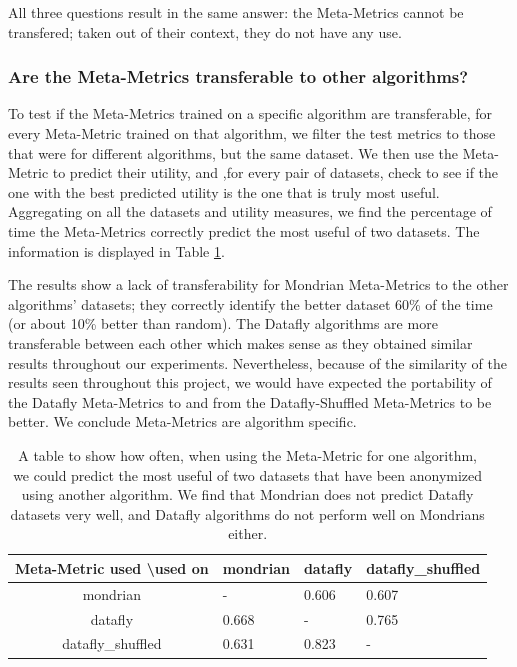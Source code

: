 All three questions result in the same answer: the Meta-Metrics cannot be transfered; taken out of their context, they do not have any use. 


\subsubsection{Are the Meta-Metrics transferable to other algorithms?}
To test if the Meta-Metrics trained on a specific algorithm are transferable, for every Meta-Metric trained on that algorithm, we filter the test metrics to those that were for different algorithms, but the same dataset. We then use the Meta-Metric to predict their utility, and ,for every pair of datasets, check to see if the one with the best predicted utility is the one that is truly most useful. Aggregating on all the datasets and utility measures, we find the percentage of time the Meta-Metrics correctly predict the most useful of two datasets. The information is displayed in Table \ref{tab:1v1_cross_algo}. 

The results show a lack of transferability for Mondrian Meta-Metrics to the other algorithms' datasets; they correctly identify the better dataset 60\% of the time (or about 10\% better than random). The Datafly algorithms are more transferable between each other which makes sense as they obtained similar results throughout our experiments. Nevertheless, because of the similarity of the results seen throughout this project, we would have expected the portability of the Datafly Meta-Metrics to and from the Datafly-Shuffled Meta-Metrics to be better. We conclude Meta-Metrics are algorithm specific.

\begin{table}[h]
\center
\begin{tabular}{|c|l|l|l|}
\hline
\rowcolor{gray!50}
Meta-Metric used \textbackslash used on  & mondrian & datafly & datafly\_shuffled \\
\hline
\cellcolor{gray!50} mondrian          & -        & 0.606   & 0.607             \\
\cellcolor{gray!50} datafly           & 0.668    & -       & 0.765             \\
\cellcolor{gray!50} datafly\_shuffled & 0.631    & 0.823   & -      \\
\hline
\end{tabular}
\caption{A table to show how often, when using the Meta-Metric for one algorithm, we could predict the most useful of two datasets that have been anonymized using another algorithm. We find that Mondrian does not predict Datafly datasets very well, and Datafly algorithms do not perform well on Mondrians either.}
\label{tab:1v1_cross_algo}
\end{table}

